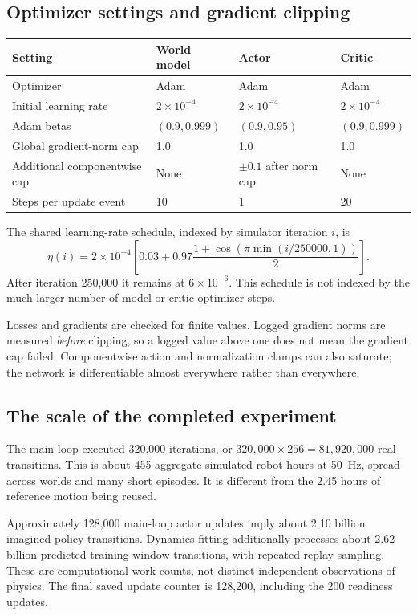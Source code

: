 \documentclass[11pt,a4paper]{article}
\begin{document}
\subsection{Optimizer settings and gradient clipping}
\begin{center}
\small
\begin{tabularx}{\linewidth}{@{}lXXX@{}}
\toprule
Setting & World model & Actor & Critic\\
\midrule
Optimizer & Adam & Adam & Adam\\
Initial learning rate & $2\times10^{-4}$ & $2\times10^{-4}$ & $2\times10^{-4}$\\
Adam betas & $(0.9,0.999)$ & $(0.9,0.95)$ & $(0.9,0.999)$\\
Global gradient-norm cap & 1.0 & 1.0 & 1.0\\
Additional componentwise cap & None & $\pm0.1$ after norm cap & None\\
Steps per update event & 10 & 1 & 20\\
\bottomrule
\end{tabularx}
\end{center}
The shared learning-rate schedule, indexed by simulator iteration $i$, is
\begin{equation}
\eta(i)=2\times10^{-4}\left[0.03+0.97\frac{1+\cos(\pi\min(i/250000,1))}{2}\right].
\end{equation}
After iteration 250,000 it remains at $6\times10^{-6}$. This schedule is not
indexed by the much larger number of model or critic optimizer steps.

Losses and gradients are checked for finite values. Logged gradient norms are
measured \emph{before} clipping, so a logged value above one does not mean the
gradient cap failed. Componentwise action and normalization clamps can also
saturate; the network is differentiable almost everywhere rather than everywhere.

\subsection{The scale of the completed experiment}
The main loop executed 320,000 iterations, or
$320{,}000\times256=81{,}920{,}000$ real transitions. This is about 455 aggregate
simulated robot-hours at 50~Hz, spread across worlds and many short episodes.
It is different from the 2.45 hours of reference motion being reused.

Approximately 128,000 main-loop actor updates imply about 2.10 billion imagined
policy transitions. Dynamics fitting additionally processes about 2.62 billion
predicted training-window transitions, with repeated replay sampling. These
are computational-work counts, not distinct independent observations of physics.
The final saved update counter is 128,200, including the 200 readiness updates.
\end{document}
